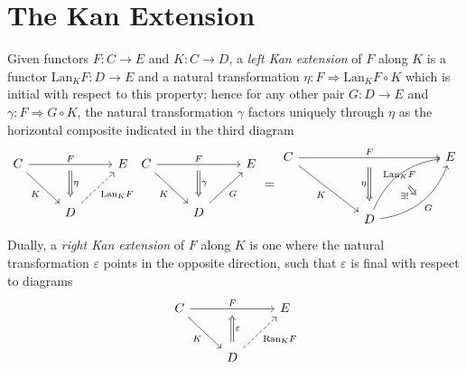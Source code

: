 \section{The Kan Extension}

\begin{definition}\label{dfn:10.2}
	Given functors $F : C \to E$ and $K : C \to D$, a \emph{left Kan extension} of $F$ along $K$ is a functor $\mathrm{Lan} _KF : D \to E$ and a natural transformation $\eta : F \Rightarrow \mathrm{Lan} _KF \circ K$ which is initial with respect to this property; hence for any other pair $G : D \to E$ and $\gamma : F \Rightarrow G\circ K$, the natural transformation $\gamma$ factors uniquely through $\eta$ as the horizontal composite indicated in the third diagram
	\[\begin{tikzcd}[row sep = 2.5em, column sep = 2.5em]
		C \ar[" F "{name=F}, rr] \ar[" K "', dr]  &  & E \\
	 & D\ar[" \mathrm{Lan} _KF "', dashed, ur]  & 
	 \arrow[from=F, to=2-2, Rightarrow, " \eta ", shorten=5pt] 
	\end{tikzcd}
\begin{tikzcd}[row sep = 2.5em, column sep = 2.5em]
	C \ar[" F "{name=F}, rr] \ar[" K "', dr]  &  & E \\
 & D \ar[" G "', ur]  & 
 \arrow[from=F, to=2-2, Rightarrow, " \gamma ", shorten=5pt] 
\end{tikzcd}
=
\begin{tikzcd}
	C &&&& E \\
	\\
	&& D
	\arrow[""{name=0, anchor=center, inner sep=0}, "F", from=1-1, to=1-5]
	\arrow["K"', from=1-1, to=3-3]
	\arrow["{\mathrm{Lan}_KF}"{name=1, anchor=center, inner sep=0}, bend left, from=3-3, to=1-5]
	\arrow[""{name=2, anchor=center, inner sep=0}, "G"', bend right, from=3-3, to=1-5]
	\arrow["\eta"', shorten <=7pt, shorten >=7pt, Rightarrow, from=0, to=3-3]
	\arrow["{\exists!}"', shorten <=8pt, shorten >=6pt, Rightarrow, from=1, to=2]
\end{tikzcd}
\]
Dually, a \emph{right Kan extension} of $F$ along $K$ is one where the natural transformation $\varepsilon $ points in the opposite direction, such that $\varepsilon $ is final with respect to diagrams
\[\begin{tikzcd}[row sep = 2.5em, column sep = 2.5em]
	C \ar[" F "{name=F}, rr] \ar[" K "', dr]  &  & E \\
 & D \ar[" \mathrm{Ran} _KF "', dashed, ur]  & 
 \arrow[from=2-2, to=F, Rightarrow, " \varepsilon  "', shorten=5pt] 
\end{tikzcd}\]
\end{definition}


